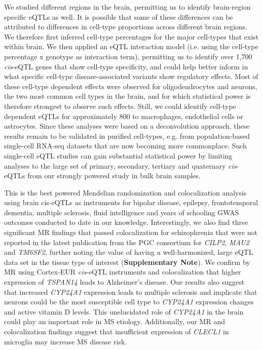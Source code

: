 We studied different regions in the brain, permitting us to identify brain-region specific eQTLs as well. It is possible that some of these differences can be attributed to differences in cell-type proportions across different brain regions. We therefore first inferred cell-type percentages for the major cell-types that exist within brain. We then applied an eQTL interaction model (i.e. using the cell-type percentage x genotype as interaction term), permitting us to identify over 1,700 \emph{cis}-eQTL genes that show cell-type specificity, and could help better inform in what specific cell-type disease-associated variants show regulatory effects. Most of these cell-type dependent effects were observed for oligodendrocytes and neurons, the two most common cell types in the brain, and for which statistical power is therefore strongest to observe such effects. Still, we could identify cell-type dependent eQTLs for approximately 800 to macrophages, endothelial cells or astrocytes. Since these analyses were based on a deconvolution approach, these results remain to be validated in purified cell-types, e.g. from population-based single-cell RNA-seq datasets that are now becoming more commonplace\cite{wijstSinglecellRNASequencing2018,PopulationscaleSinglecellRNAseq}. Such single-cell eQTL studies can gain substantial statistical power by limiting analyses to the large set of primary, secondary, tertiary and quaternary \emph{cis}-eQTLs from our strongly powered study in bulk brain samples. 

This is the best powered Mendelian randomization and colocalization analysis using brain cis-eQTLs as instruments for bipolar disease, epilepsy, frontotemporal dementia, multiple sclerosis, fluid intelligence and years of schooling GWAS outcomes conducted to date in our knowledge. Interestingly, we also find three significant MR findings that passed colocalization for schizophrenia that were not reported in the latest publication from the PGC consortium for \emph{CILP2}, \emph{MAU2} and \emph{TM6SF2}\cite{consortiumMappingGenomicLoci2020}, further noting the value of having a well-harmonized, large eQTL data set in the tissue type of interest (\textbf{Supplementary Note}). We confirm by MR using Cortex-EUR \emph{cis}-eQTL instruments and colocalization that higher expression of \emph{TSPAN14} leads to Alzheimer’s disease. Our results also suggest that increased \emph{CYP24A1} expression leads to multiple sclerosis and implicate that neurons could be the most susceptible cell type to \emph{CYP24A1} expression changes and active vitamin D levels. This unelucidated role of \emph{CYP24A1} in the brain could play an important role in MS etiology. Additionally, our MR and colocalization findings suggest that insufficient expression of \emph{CLECL1} in microglia may increase MS disease risk.

